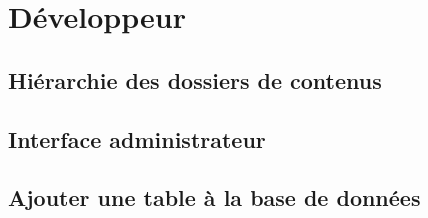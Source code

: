 \part{Développeur}



\chapter{Hiérarchie des dossiers de contenus}



\chapter{Interface administrateur}



\chapter{Ajouter une table à la base de données}


